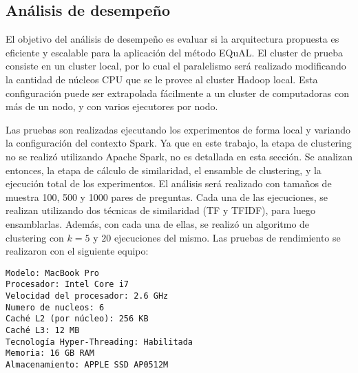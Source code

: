 \subsection{Análisis de desempeño}

El objetivo del análisis de desempeño es evaluar si la arquitectura propuesta es eficiente y escalable para la aplicación del método EQuAL. El cluster de prueba consiste en un cluster local, por lo cual el paralelismo será realizado modificando la cantidad de núcleos CPU que se le provee al cluster Hadoop local. Esta configuración puede ser extrapolada fácilmente a un cluster de computadoras con más de un nodo, y con varios ejecutores por nodo.

\bigskip Las pruebas son realizadas ejecutando los experimentos de forma local y variando la configuración del contexto Spark. Ya que en este trabajo, la etapa de clustering no se realizó utilizando Apache Spark, no es detallada en esta sección. Se analizan entonces, la etapa de cálculo de similaridad, el ensamble de clustering, y la ejecución total de los experimentos. El análisis será realizado con tamaños de muestra 100, 500 y 1000 pares de preguntas. Cada una de las ejecuciones, se realizan utilizando dos técnicas de similaridad (TF y TFIDF), para luego ensamblarlas. Además, con cada una de ellas, se realizó un algoritmo de clustering con \(k = 5\) y \(20\) ejecuciones del mismo. Las pruebas de rendimiento se realizaron con el siguiente equipo:

\begin{verbatim}
Modelo: MacBook Pro
Procesador: Intel Core i7
Velocidad del procesador: 2.6 GHz
Numero de nucleos: 6
Caché L2 (por núcleo): 256 KB
Caché L3: 12 MB
Tecnología Hyper-Threading: Habilitada
Memoria: 16 GB RAM
Almacenamiento: APPLE SSD AP0512M
\end{verbatim}

